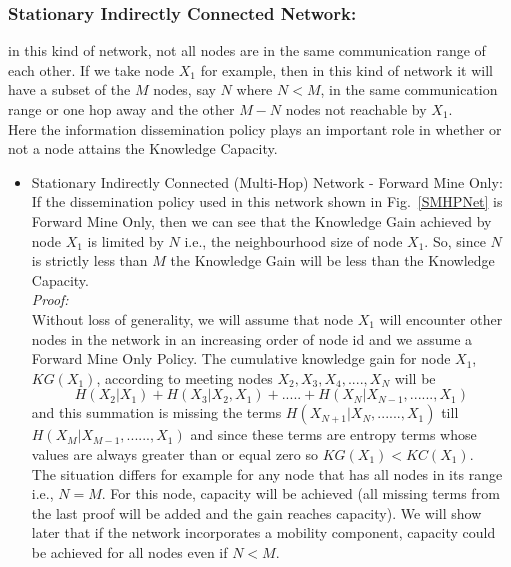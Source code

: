 \documentclass[11pt]{article}
\begin{document}
\subsubsection{Stationary Indirectly Connected Network:} in this kind of network, not all nodes are in the same communication range of each other. If we take node $X_1$ for example, then in this kind of network it will have a subset of the $M$ nodes, say $N$ where $N<M$, in the same communication range or one hop away and the other $M-N$ nodes not reachable by $X_1$.\\
Here the information dissemination policy plays an important role in whether or not a node attains the Knowledge Capacity.
\begin{itemize}
\item{Stationary Indirectly Connected (Multi-Hop) Network - Forward Mine Only:}
If the dissemination policy used in this network shown in Fig.~\ref{SMHPNet} is Forward Mine Only, then we can see that the Knowledge Gain achieved by node $X_1$ is limited by $N$ i.e., the neighbourhood size of node $X_1$. So, since $N$ is strictly less than $M$ the Knowledge Gain will be less than the Knowledge Capacity.\\
\textit{Proof:}\\
Without loss of generality, we will assume that node $X_1$ will encounter other nodes in the network in an increasing order of node id and we assume a Forward Mine Only Policy. The cumulative knowledge gain for node $X_1$, $KG(X_1)$, according to meeting nodes $X_2, X_3, X_4,...., X_{N}$ will be $$H(X_2|X_1) + H(X_3|X_2,X_1) + .....+ H(X_{N}|X_{N-1}, ......, X_1)$$ and this summation is missing the terms $H(X_{N+1}|X_{N}, ......, X_1)$ till $H(X_{M}|X_{M-1}, ......, X_1)$ and since these terms are entropy terms whose values are always greater than or equal zero so $KG(X_1) <  KC(X_1)$.\\
The situation differs for example for any node that has all nodes in its range i.e., $N=M$. For this node, capacity will be achieved (all missing terms from the last proof will be added and the gain reaches capacity). We will show later that if the network incorporates a mobility component, capacity could be achieved for all nodes even if $N<M$.\\


\end{itemize}
\end{document}
